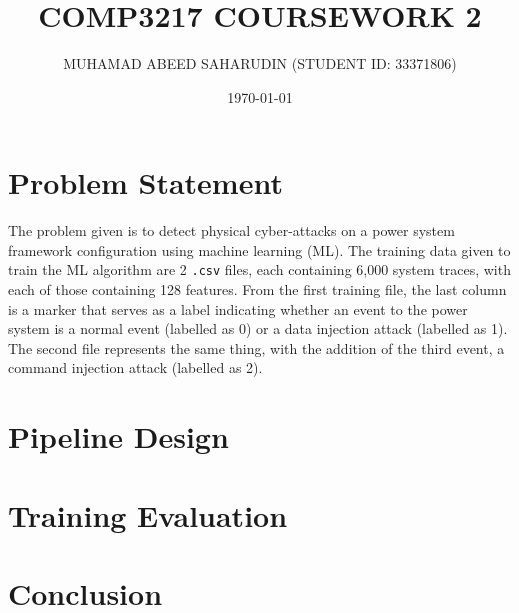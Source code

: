 \documentclass[12pt]{article}
\title{COMP3217 COURSEWORK 2}
\author{MUHAMAD ABEED SAHARUDIN (STUDENT ID: 33371806)}
\date{\today}
\begin{document}
    \maketitle

    \section{Problem Statement}

        The problem given is to detect physical cyber-attacks on a power system framework configuration using machine
        learning (ML). The training data given to train the ML algorithm are 2 \verb|.csv| files, each containing 6,000
        system traces, with each of those containing 128 features. From the first training file, the last column is a 
        marker that serves as a label indicating whether an event to the power system is a normal event (labelled as 0) 
        or a data injection attack (labelled as 1). The second file represents the same thing, with the addition of the 
        third event, a command injection attack (labelled as 2).

    \section{Pipeline Design}

        

    \section{Training Evaluation}

    \section{Conclusion}
\end{document}
